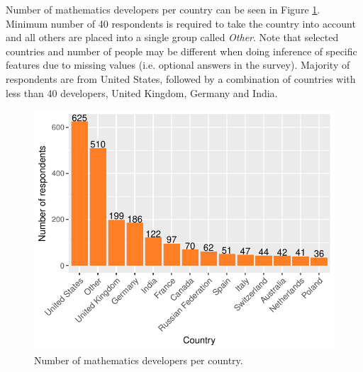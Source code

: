 \documentclass[9pt]{article}
\begin{document}
\vspace{2mm}

Number of mathematics developers per country can be seen in Figure \ref{fig_0}. Minimum number of 40 respondents is required to take the country into account and all others are placed into a single group called \textit{Other}. Note that selected countries and number of people may be different when doing inference of specific features due to missing values (i.e. optional answers in the survey). Majority of respondents are from United States, followed by a combination of countries with less than 40 developers, United Kingdom, Germany and India.


\begin{figure}[H]
\centering
\includegraphics{report-005}
\caption{Number of mathematics developers per country.}\label{fig_0}
\end{figure}
\end{document}

